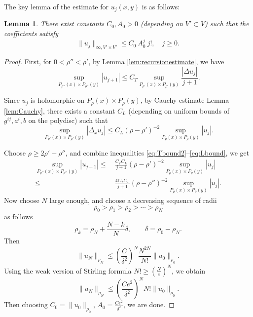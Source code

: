 \documentclass[11pt]{amsart}
\theoremstyle{plain}
\newtheorem{lem}[thm]{Lemma}
\theoremstyle{definition}
\begin{document}
The key lemma of the estimate for $u_j(x,y)$ is as follows:

\begin{lem}\label{lem:factorialU}
There exist constants $C_0,A_0>0$ (depending on $V'\subset V$) such that the coefficients satisfy
\begin{equation*}\label{eq:ujBound}
\|u_j\|_{\infty,V'\times V'} \le C_0~A_0^{j}~j!,
\quad j\ge0.
\end{equation*}
\end{lem}

\begin{proof}
First, for $0<\rho''<\rho'$, by Lemma \ref{lem:recursionestimate}, we have
\begin{equation}\label{eq:Tbound2}
\sup_{P_{\rho''}(x)\times P_{\rho''}(y)} |u_{j+1}|
 \le C_T\sup_{P_{\rho'}(x)\times P_{\rho'}(y)} \frac{|\Delta u_j|}{j+1}.
\end{equation}

\smallskip
Since $u_j$ is holomorphic on $P_\rho(x)\times P_\rho(y)$, by Cauchy estimate Lemma \ref{lem:Cauchy}, there exists a constant $C_L$ (depending on uniform bounds of $g^{ij},a^i,b$ on the polydisc) such that
\begin{equation}\label{eq:Lbound}
\sup_{P_{\rho'}(x)\times P_{\rho'}(y)} |\Delta_x u_j|
\le C_L(\rho-\rho')^{-2}
\sup_{P_{\rho}(x)\times P_{\rho}(y)} |u_j|.
\end{equation}

Choose $\rho\geq2\rho'-\rho''$, and combine inequalities \eqref{eq:Tbound2}--\eqref{eq:Lbound}, we get
\begin{align*}
\sup_{P_{\rho''}(x)\times P_{\rho''}(y)} |u_{j+1}|
 \le~&\frac{C_TC_L}{j+1}(\rho-\rho')^{-2}\sup_{P_{\rho}(x)\times P_{\rho}(y)} |u_j|\\
 \le~&\frac{4C_TC_L}{j+1}(\rho-\rho'')^{-2}\sup_{P_{\rho}(x)\times P_{\rho}(y)} |u_j|.
\end{align*}
\medskip
Now choose $N$ large enough, and choose a decreasing sequence of radii
\[\rho_0>\rho_1>\rho_2>\cdots>\rho_N\]
as follows
\[\rho_k=\rho_N+\frac{N-k}{N}\delta, \qquad \delta=\rho_0-\rho_N.\]
Then
\[\|u_N\|_{\rho_N}\leq\left(\frac{C}{\delta^2}\right)^N\frac{N^{2N}}{N!}\|u_0\|_{\rho_0}.\]
Using the weak version of Stirling formula
$N!\ge\left(\frac{N}{e}\right)^N$, we obtain
\[\|u_N\|_{\rho_N}\leq\left(\frac{Ce^2}{\delta^2}\right)^NN!\|u_0\|_{\rho_0}.\]
Then choosing $C_0=\|u_0\|_{\rho_0}$, $A_0=\frac{Ce^2}{\delta^2}$, we are done. 
\end{proof}
\end{document}
